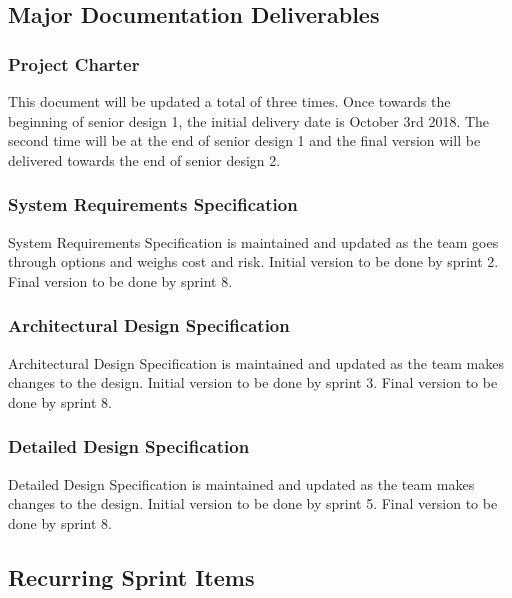 
\subsection{Major Documentation Deliverables}

\subsubsection{Project Charter}

This document will be updated a total of three times. Once towards the beginning of senior design 1, the initial delivery date is October 3rd 2018. The second time will be at the end of senior design 1 and the final version will be delivered towards the end of senior design 2.

\subsubsection{System Requirements Specification}
System Requirements Specification is maintained and updated as the team goes through options and weighs cost and risk. Initial version to be done by sprint 2. Final version to be done by sprint 8.

\subsubsection{Architectural Design Specification}
Architectural Design Specification is maintained and updated as the team makes changes to the design. Initial version to be done by sprint 3. Final version to be done by sprint 8.

\subsubsection{Detailed Design Specification}
Detailed Design Specification is maintained and updated as the team makes changes to the design. Initial version to be done by sprint 5. Final version to be done by sprint 8.

\subsection{Recurring Sprint Items}


